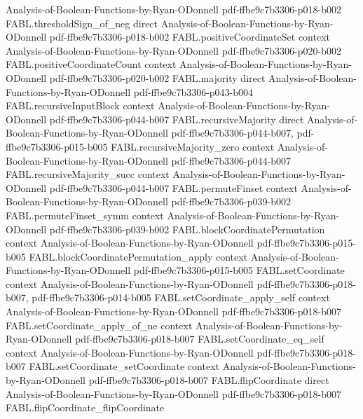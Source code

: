 \begin{theorem}
  {Analysis-of-Boolean-Functions-by-Ryan-ODonnell}
  {pdf-ffbe9c7b3306-p018-b002}
\proofstep
  {FABL.thresholdSign_of_neg}
  {direct}
  {Analysis-of-Boolean-Functions-by-Ryan-ODonnell}
  {pdf-ffbe9c7b3306-p018-b002}
\proofstep
  {FABL.positiveCoordinateSet}
  {context}
  {Analysis-of-Boolean-Functions-by-Ryan-ODonnell}
  {pdf-ffbe9c7b3306-p020-b002}
\proofstep
  {FABL.positiveCoordinateCount}
  {context}
  {Analysis-of-Boolean-Functions-by-Ryan-ODonnell}
  {pdf-ffbe9c7b3306-p020-b002}
\proofstep
  {FABL.majority}
  {direct}
  {Analysis-of-Boolean-Functions-by-Ryan-ODonnell}
  {pdf-ffbe9c7b3306-p043-b004}
\proofstep
  {FABL.recursiveInputBlock}
  {context}
  {Analysis-of-Boolean-Functions-by-Ryan-ODonnell}
  {pdf-ffbe9c7b3306-p044-b007}
\proofstep
  {FABL.recursiveMajority}
  {direct}
  {Analysis-of-Boolean-Functions-by-Ryan-ODonnell}
  {pdf-ffbe9c7b3306-p044-b007,
    pdf-ffbe9c7b3306-p015-b005}
\proofstep
  {FABL.recursiveMajority_zero}
  {context}
  {Analysis-of-Boolean-Functions-by-Ryan-ODonnell}
  {pdf-ffbe9c7b3306-p044-b007}
\proofstep
  {FABL.recursiveMajority_succ}
  {context}
  {Analysis-of-Boolean-Functions-by-Ryan-ODonnell}
  {pdf-ffbe9c7b3306-p044-b007}
\proofstep
  {FABL.permuteFinset}
  {context}
  {Analysis-of-Boolean-Functions-by-Ryan-ODonnell}
  {pdf-ffbe9c7b3306-p039-b002}
\proofstep
  {FABL.permuteFinset_symm}
  {context}
  {Analysis-of-Boolean-Functions-by-Ryan-ODonnell}
  {pdf-ffbe9c7b3306-p039-b002}
\proofstep
  {FABL.blockCoordinatePermutation}
  {context}
  {Analysis-of-Boolean-Functions-by-Ryan-ODonnell}
  {pdf-ffbe9c7b3306-p015-b005}
\proofstep
  {FABL.blockCoordinatePermutation_apply}
  {context}
  {Analysis-of-Boolean-Functions-by-Ryan-ODonnell}
  {pdf-ffbe9c7b3306-p015-b005}
\proofstep
  {FABL.setCoordinate}
  {context}
  {Analysis-of-Boolean-Functions-by-Ryan-ODonnell}
  {pdf-ffbe9c7b3306-p018-b007,
    pdf-ffbe9c7b3306-p014-b005}
\proofstep
  {FABL.setCoordinate_apply_self}
  {context}
  {Analysis-of-Boolean-Functions-by-Ryan-ODonnell}
  {pdf-ffbe9c7b3306-p018-b007}
\proofstep
  {FABL.setCoordinate_apply_of_ne}
  {context}
  {Analysis-of-Boolean-Functions-by-Ryan-ODonnell}
  {pdf-ffbe9c7b3306-p018-b007}
\proofstep
  {FABL.setCoordinate_eq_self}
  {context}
  {Analysis-of-Boolean-Functions-by-Ryan-ODonnell}
  {pdf-ffbe9c7b3306-p018-b007}
\proofstep
  {FABL.setCoordinate_setCoordinate}
  {context}
  {Analysis-of-Boolean-Functions-by-Ryan-ODonnell}
  {pdf-ffbe9c7b3306-p018-b007}
\proofstep
  {FABL.flipCoordinate}
  {direct}
  {Analysis-of-Boolean-Functions-by-Ryan-ODonnell}
  {pdf-ffbe9c7b3306-p018-b007}
\proofstep
  {FABL.flipCoordinate_flipCoordinate}

\end{theorem}
